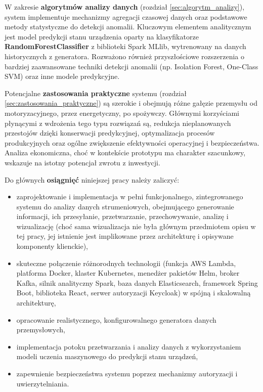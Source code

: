 W zakresie \textbf{algorytmów analizy danych} (rozdział \ref{sec:algorytm_analizy}), system implementuje mechanizmy agregacji czasowej danych oraz podstawowe metody statystyczne do detekcji anomalii. Kluczowym elementem analitycznym jest model predykcji stanu urządzenia oparty na klasyfikatorze \textbf{RandomForestClassifier} z biblioteki Spark MLlib, wytrenowany na danych historycznych z generatora. Rozważono również przyszłościowe rozszerzenia o bardziej zaawansowane techniki detekcji anomalii (np. Isolation Forest, One-Class SVM) oraz inne modele predykcyjne.

Potencjalne \textbf{zastosowania praktyczne} systemu (rozdział \ref{sec:zastosowania_praktyczne}) są szerokie i obejmują różne gałęzie przemysłu od motoryzacyjnego, przez energetyczny, po spożywczy. Głównymi korzyściami płynącymi z wdrożenia tego typu rozwiązań są, redukcja nieplanowanych przestojów dzięki konserwacji predykcyjnej, optymalizacja procesów produkcyjnych oraz ogólne zwiększenie efektywności operacyjnej i bezpieczeństwa. Analiza ekonomiczna, choć w kontekście prototypu ma charakter szacunkowy, wskazuje na istotny potencjał zwrotu z inwestycji.

\vspace{0.3em}

Do głównych \textbf{osiągnięć} niniejszej pracy należy zaliczyć:
\begin{itemize}
    \item zaprojektowanie i implementacja w pełni funkcjonalnego, zintegrowanego systemu do analizy danych  strumeniowych, obejmującego generowanie informacji, ich przesyłanie, przetwarzanie, przechowywanie, analizę i wizualizację (choć sama wizualizacja nie była głównym przedmiotem opisu w tej pracy, jej istnienie jest implikowane przez architekturę i opisywane komponenty klienckie),
    \item skuteczne połączenie różnorodnych technologii (funkcja AWS Lambda, platforma Docker, klaster Kubernetes, menedżer pakietów Helm, broker Kafka, silnik analityczny Spark, baza danych Elasticsearch, framework Spring Boot, biblioteka React, serwer autoryzacji Keycloak) w spójną i skalowalną architekturę,
    \item opracowanie realistycznego, konfigurowalnego generatora danych przemysłowych,
    \item implementacja potoku przetwarzania i analizy danych z wykorzystaniem modeli uczenia maszynowego do predykcji stanu urządzeń,
    \item zapewnienie bezpieczeństwa systemu poprzez mechanizmy autoryzacji i uwierzytelniania.
\end{itemize}

